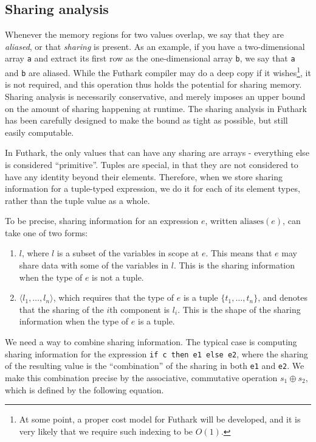 \documentclass[oneside]{memoir}
\newcommand\aliases[1]{\textrm{aliases}(#1)}
\begin{document}
\subsection{Sharing analysis}
\label{sec:futhark-sharing}

Whenever the memory regions for two values overlap, we say that they
are \textit{aliased}, or that \textit{sharing} is present.  As an
example, if you have a two-dimensional array \texttt{a} and extract
its first row as the one-dimensional array \texttt{b}, we say that
\texttt{a} and \texttt{b} are aliased.  While the Futhark compiler may
do a deep copy if it wishes\footnote{At some point, a proper cost
  model for Futhark will be developed, and it is very likely that we
  require such indexing to be $O(1)$.}, it is not required, and this
operation thus holds the potential for sharing memory.  Sharing
analysis is necessarily conservative, and merely imposes an upper
bound on the amount of sharing happening at runtime.  The sharing
analysis in Futhark has been carefully designed to make the bound as
tight as possible, but still easily computable.

In Futhark, the only values that can have any sharing are arrays -
everything else is considered ``primitive''.  Tuples are special, in
that they are not considered to have any identity beyond their
elements.  Therefore, when we store sharing information for a
tuple-typed expression, we do it for each of its element types, rather
than the tuple value as a whole.

To be precise, sharing information for an expression $e$, written
$\aliases{e}$, can take one of two forms:

\begin{enumerate}
\item $l$, where $l$ is a subset of the variables in scope at $e$.
  This means that $e$ may share data with some of the variables in
  $l$.  This is the sharing information when the type of $e$ is not a
  tuple.

\item $\langle l_{1}, \ldots, l_{n} \rangle$, which requires that the
  type of $e$ is a tuple $\{t_{1}, \ldots, t_{n}\}$, and denotes that
  the sharing of the $i$th component is $l_{i}$.  This is the shape of
  the sharing information when the type of $e$ is a tuple.
\end{enumerate}

We need a way to combine sharing information.  The typical case is
computing sharing information for the expression \texttt{if c then e1
  else e2}, where the sharing of the resulting value is the
``combination'' of the sharing in both \texttt{e1} and \texttt{e2}.
We make this combination precise by the associative, commutative
operation $s_{1} \oplus s_{2}$, which is defined by the following
equation.
\end{document}
